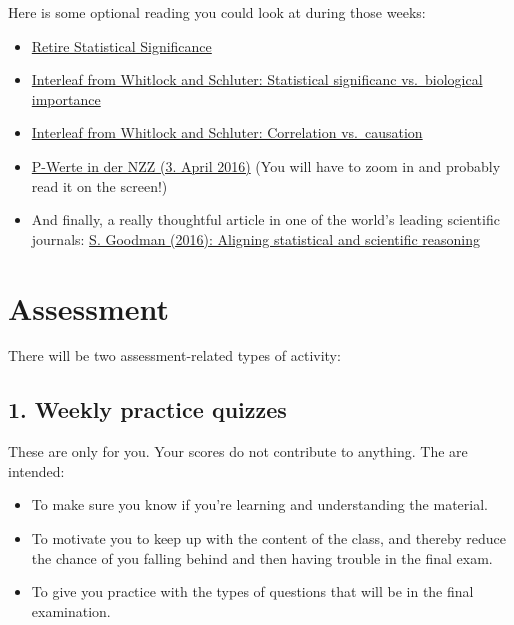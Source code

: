 \documentclass[
  letterpaper,
  8pt,
  a4paper]{book}
\providecommand{\tightlist}{%
  \setlength{\itemsep}{0pt}\setlength{\parskip}{0pt}}
\begin{document}
Here is some optional reading you could look at during those weeks:

\begin{itemize}
\tightlist
\item
  \href{Amrhein_etal2019.pdf}{Retire Statistical Significance}
\item
  \href{significanceVSimportance_Whitlock.pdf}{Interleaf from Whitlock
  and Schluter: Statistical significanc vs.~biological importance}
\item
  \href{correlationVScausation.pdf}{Interleaf from Whitlock and
  Schluter: Correlation vs.~causation}
\item
  \href{NZZ_April2016.pdf}{P-Werte in der NZZ (3. April 2016)} (You will
  have to zoom in and probably read it on the screen!)
\item
  And finally, a really thoughtful article in one of the world's leading
  scientific journals: \href{Goodman_2016_Science.pdf}{S. Goodman
  (2016): Aligning statistical and scientific reasoning}
\end{itemize}

\section*{Assessment}\label{assessment}


There will be two assessment-related types of activity:

\subsection*{1. Weekly practice quizzes}\label{weekly-practice-quizzes}

These are only for you. Your scores do not contribute to anything. The
are intended:

\begin{itemize}
\tightlist
\item
  To make sure you know if you're learning and understanding the
  material.
\item
  To motivate you to keep up with the content of the class, and thereby
  reduce the chance of you falling behind and then having trouble in the
  final exam.
\item
  To give you practice with the types of questions that will be in the
  final examination.
\end{itemize}
\end{document}
